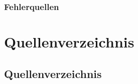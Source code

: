 \documentclass[letterpaper,10pt,german]{jupyterBook}
\begin{document}
\section{Fehlerquellen}
\label{\detokenize{chapters/chapter4/Fehlerquellen:fehlerquellen}}\label{\detokenize{chapters/chapter4/Fehlerquellen::doc}}
\sphinxstepscope


\part{Quellenverzeichnis}

\sphinxstepscope


\chapter{Quellenverzeichnis}
\label{\detokenize{quellen:quellenverzeichnis}}\label{\detokenize{quellen::doc}}
\end{document}
